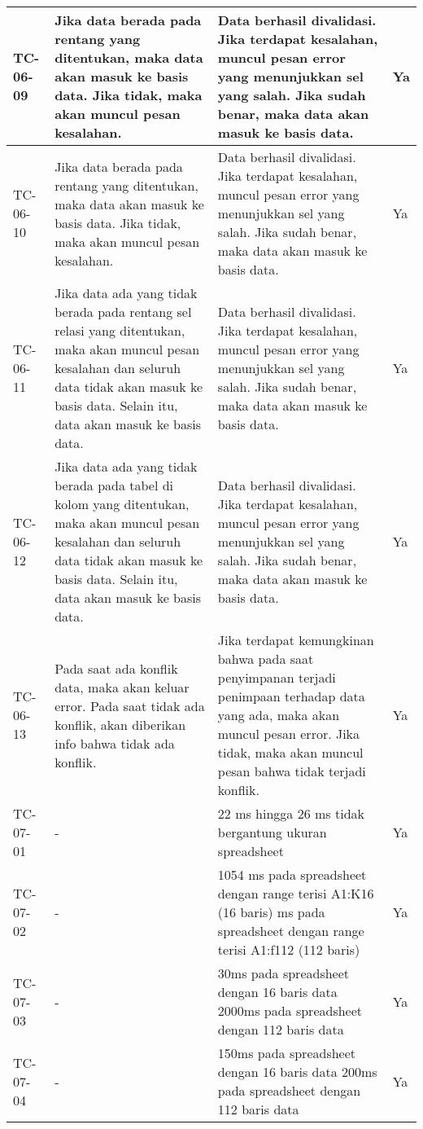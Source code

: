 \begin{small}
\begin{longtable}{ | p{2cm} | p{4cm} | p{4cm} | p{2cm} | }
	\\ \hline TC-06-09 & Jika data berada pada rentang yang ditentukan, maka data akan masuk ke basis data. Jika tidak, maka akan muncul pesan kesalahan. & Data berhasil divalidasi. Jika terdapat kesalahan, muncul pesan error yang menunjukkan sel yang salah. Jika sudah benar, maka data akan masuk ke basis data. & Ya
	\\ \hline TC-06-10 & Jika data berada pada rentang yang ditentukan, maka data akan masuk ke basis data. Jika tidak, maka akan muncul pesan kesalahan. & Data berhasil divalidasi. Jika terdapat kesalahan, muncul pesan error yang menunjukkan sel yang salah. Jika sudah benar, maka data akan masuk ke basis data. & Ya
	\\ \hline TC-06-11 & Jika data ada yang tidak berada pada rentang sel relasi yang ditentukan, maka akan muncul pesan kesalahan dan seluruh data tidak akan masuk ke basis data. Selain itu, data akan masuk ke basis data. & Data berhasil divalidasi. Jika terdapat kesalahan, muncul pesan error yang menunjukkan sel yang salah. Jika sudah benar, maka data akan masuk ke basis data. & Ya
	\\ \hline TC-06-12 & Jika data ada yang tidak berada pada tabel di kolom yang ditentukan, maka akan muncul pesan kesalahan dan seluruh data tidak akan masuk ke basis data. Selain itu, data akan masuk ke basis data. & Data berhasil divalidasi. Jika terdapat kesalahan, muncul pesan error yang menunjukkan sel yang salah. Jika sudah benar, maka data akan masuk ke basis data. & Ya
	\\ \hline TC-06-13 & Pada saat ada konflik data, maka akan keluar error. Pada saat tidak ada konflik, akan diberikan info bahwa tidak ada konflik. & Jika terdapat kemungkinan bahwa pada saat penyimpanan terjadi penimpaan terhadap data yang ada, maka akan muncul pesan error. Jika tidak, maka  akan muncul pesan bahwa tidak terjadi konflik. & Ya

	\\ \hline TC-07-01 & - & 22 ms hingga 26 ms tidak bergantung ukuran spreadsheet & Ya
	\\ \hline TC-07-02 & - & 1054 ms pada spreadsheet dengan range terisi A1:K16 (16 baris) \newline 5736 ms pada spreadsheet dengan range terisi A1:f112 (112 baris) & Ya
	\\ \hline TC-07-03 & - & 30ms pada spreadsheet dengan 16 baris data \newline 2000ms pada spreadsheet dengan 112 baris data & Ya
	\\ \hline TC-07-04 & - & 150ms pada spreadsheet dengan 16 baris data \newline 200ms pada spreadsheet dengan 112 baris data & Ya
	\\ \hline
\end{longtable}
\end{small}
